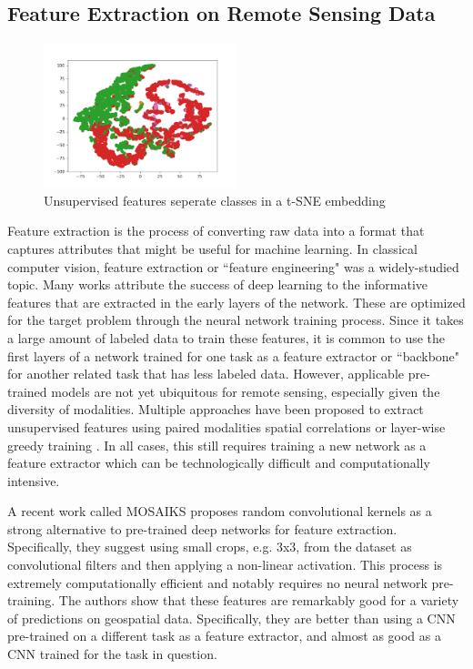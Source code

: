 \subsection{Feature Extraction on Remote Sensing Data}
\begin{figure}
    \centering
    \includegraphics[width=0.5\textwidth]{figs/methods/IPP/TSNE_features.png}
    \caption{Unsupervised features seperate classes in a t-SNE embedding}
    \label{fig:methods:ipp_feature_embedding}
\end{figure}

Feature extraction is the process of converting raw data into a format that captures attributes that might be useful for machine learning. In classical computer vision, feature extraction or ``feature engineering" was a widely-studied topic. Many works attribute the success of deep learning to the informative features that are extracted in the early layers of the network. These are optimized for the target problem through the neural network training process. Since it takes a large amount of labeled data to train these features, it is common to use the first layers of a network trained for one task as a feature extractor or ``backbone" for another related task that has less labeled data. However, applicable pre-trained models are not yet ubiquitous for remote sensing, especially given the diversity of modalities. Multiple approaches have been proposed to extract unsupervised features using paired modalities \cite{Xie2016TransferMapping} spatial correlations \cite{Jean2019Tile2Vec:Data} or layer-wise greedy training \cite{Romero2016UnsupervisedClassification}. In all cases, this still requires training a new network as a feature extractor which can be technologically difficult and computationally intensive.

A recent work called MOSAIKS \cite{Rolf2021} proposes random convolutional kernels as a strong alternative to pre-trained deep networks for feature extraction. Specifically, they suggest using small crops, e.g. 3x3, from the dataset as convolutional filters and then applying a non-linear activation. This process is extremely computationally efficient and notably requires no neural network pre-training. The authors show that these features are remarkably good for a variety of predictions on geospatial data. Specifically, they are better than using a CNN pre-trained on a different task as a feature extractor, and almost as good as a CNN trained for the task in question.

